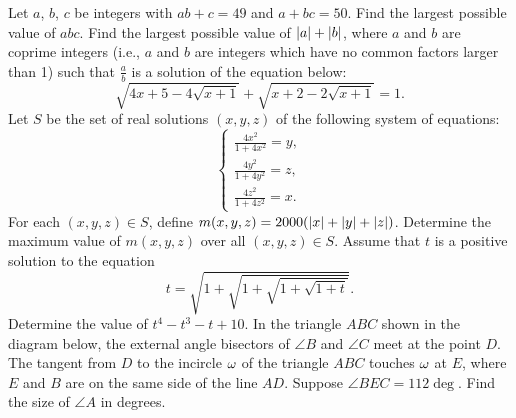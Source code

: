 \begin{enumerate}
\begin{center}
    \end{center}
    \hyperrefitem[A::2022-O-1-11] Let $a$, $b$, $c$ be integers with $ab + c = 49$ and $a + bc = 50$. Find the largest possible value of $abc$.
    \hyperrefitem[A::2022-O-1-12] Find the largest possible value of $\left\lvert a \right\rvert + \left\lvert b \right\rvert$, where $a$ and $b$ are coprime integers (i.e., $a$ and $b$ are integers which have no common factors larger than 1) such that $\frac{a}{b}$ is a solution of the equation below: \[\sqrt{4x + 5 - 4\sqrt{x+1}} + \sqrt{x+2 - 2\sqrt{x+1}} = 1.\]
    \hyperrefitem[A::2022-O-1-13] Let $S$ be the set of real solutions $(x, y, z)$ of the following system of equations: \[\left\{
        \begin{aligned}
            \frac{4x^2}{1 + 4x^2} = y,\\
            \frac{4y^2}{1 + 4y^2} = z,\\
            \frac{4z^2}{1 + 4z^2} = x.
        \end{aligned}\right.\] For each $(x, y, z) \in S$, define $m(x, y, z) = 2000(\left\lvert x \right\rvert + \left\lvert y \right\rvert + \left\lvert z \right\rvert)$. Determine the maximum value of $m(x, y, z)$ over all $(x, y, z) \in S$.
    \hyperrefitem[A::2022-O-1-14] Assume that $t$ is a positive solution to the equation \[t = \sqrt{1 + \sqrt{1 + \sqrt{1 + \sqrt{1 + t}}}}.\] Determine the value of $t^4 - t^3 - t + 10$.
    \hyperrefitem[A::2022-O-1-15] In the triangle $ABC$ shown in the diagram below, the external angle bisectors of $\angle B$ and $\angle C$ meet at the point $D$. The tangent from $D$ to the incircle $\omega$ of the triangle $ABC$ touches $\omega$ at $E$, where $E$ and $B$ are on the same side of the line $AD$. Suppose $\angle BEC = 112\deg$. Find the size of $\angle A$ in degrees.

    \begin{center}
\end{center}
\end{enumerate}
